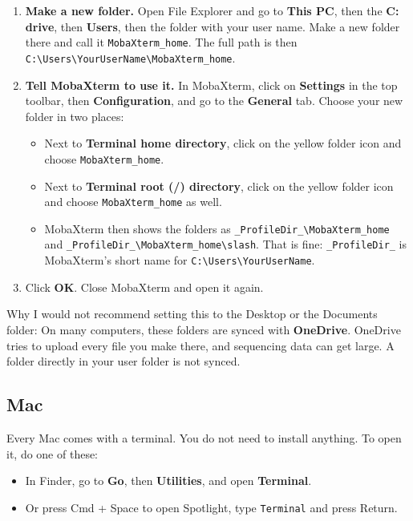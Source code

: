 \documentclass[
  letterpaper,
  DIV=11,
  numbers=noendperiod]{scrreprt}
\providecommand{\tightlist}{%
  \setlength{\itemsep}{0pt}\setlength{\parskip}{0pt}}
\begin{document}
\begin{enumerate}
\def\labelenumi{\arabic{enumi}.}
\tightlist
\item
  \textbf{Make a new folder.} Open File Explorer and go to \textbf{This
  PC}, then the \textbf{C: drive}, then \textbf{Users}, then the folder
  with your user name. Make a new folder there and call it
  \texttt{MobaXterm\_home}. The full path is then
  \texttt{C:\textbackslash{}Users\textbackslash{}YourUserName\textbackslash{}MobaXterm\_home}.
\item
  \textbf{Tell MobaXterm to use it.} In MobaXterm, click on
  \textbf{Settings} in the top toolbar, then \textbf{Configuration}, and
  go to the \textbf{General} tab. Choose your new folder in two places:

  \begin{itemize}
  \tightlist
  \item
    Next to \textbf{Terminal home directory}, click on the yellow folder
    icon and choose \texttt{MobaXterm\_home}.
  \item
    Next to \textbf{Terminal root (/) directory}, click on the yellow
    folder icon and choose \texttt{MobaXterm\_home} as well.
  \item
    MobaXterm then shows the folders as
    \texttt{\_ProfileDir\_\textbackslash{}MobaXterm\_home} and
    \texttt{\_ProfileDir\_\textbackslash{}MobaXterm\_home\textbackslash{}slash}.
    That is fine: \texttt{\_ProfileDir\_} is MobaXterm's short name for
    \texttt{C:\textbackslash{}Users\textbackslash{}YourUserName}.
  \end{itemize}
\item
  Click \textbf{OK}. Close MobaXterm and open it again.
\end{enumerate}

Why I would not recommend setting this to the Desktop or the Documents
folder: On many computers, these folders are synced with
\textbf{OneDrive}. OneDrive tries to upload every file you make there,
and sequencing data can get large. A folder directly in your user folder
is not synced.

\subsection{Mac}\label{mac}

Every Mac comes with a terminal. You do not need to install anything. To
open it, do one of these:

\begin{itemize}
\tightlist
\item
  In Finder, go to \textbf{Go}, then \textbf{Utilities}, and open
  \textbf{Terminal}.
\item
  Or press Cmd + Space to open Spotlight, type \texttt{Terminal} and
  press Return.
\end{itemize}
\end{document}
